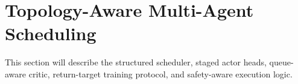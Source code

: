 \section{Topology-Aware Multi-Agent Scheduling}

This section will describe the structured scheduler, staged actor heads,
queue-aware critic, return-target training protocol, and safety-aware execution
logic.
